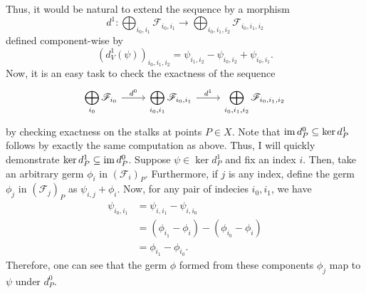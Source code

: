 Thus, it would be natural to extend the sequence by a morphism
\[
  d^{1}:\bigoplus_{i_{0},i_{1}}\mathscr{F}_{i_{0},i_{1}}
  \to\bigoplus_{i_{0},i_{1},i_{2}}\mathscr{F}_{i_{0},i_{1},i_{2}}
\]
defined component-wise by
\[
  \left(d^{1}_{V}(\psi)\right)_{i_{0},i_{1},i_{2}}=
  \psi_{i_{1},i_{2}}-\psi_{i_{0},i_{2}}+\psi_{i_{0},i_{1}}.
\]
Now, it is an easy task to check the exactness of the sequence
\[\begin{tikzcd}
    \displaystyle\bigoplus_{i_{0}}\mathscr{F}_{i_{0}}\rar{d^{0}}
    & \displaystyle\bigoplus_{i_{0},i_{1}}\mathscr{F}_{i_{0},i_{1}}\rar{d^{1}}
    & \displaystyle\bigoplus_{i_{0},i_{1},i_{2}}\mathscr{F}_{i_{0},i_{1},i_{2}}
  \end{tikzcd}\]
by checking exactness on the stalks at points $P\in X$. Note that
$\operatorname{im} d^{0}_{P}\subseteq\ker d^{1}_{P}$ follows by exactly the same computation
as above. Thus, I will quickly demonstrate
$\ker d^{1}_{P}\subseteq\operatorname{im} d^{0}_{P}$. Suppose $\psi\in\ker d^{1}_{P}$ and fix
an index $i$. Then, take an arbitrary germ $\phi_{i}$
in $\left(\mathscr{F}_{i}\right)_{P}$. Furthermore, if $j$ is any index,
define the germ $\phi_{j}$ in $\left(\mathscr{F}_{j}\right)_{P}$ as
$\psi_{i,j}+\phi_{i}$. Now, for any pair of indecies $i_{0},i_{1}$, we have
\begin{align*}
  \psi_{i_{0},i_{1}}
  &=\psi_{i,i_{1}}-\psi_{i,i_{0}} \\
  &=\left(\phi_{i_{1}}-\phi_{i}\right)-\left(\phi_{i_{0}}-\phi_{i}\right) \\
  &=\phi_{i_{1}}-\phi_{i_{0}}.
\end{align*}
Therefore, one can see that the germ $\phi$ formed from these components
$\phi_{j}$ map to $\psi$ under $d^{0}_{P}$.

